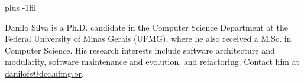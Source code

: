 \documentclass[10pt,journal,compsoc]{IEEEtran}
\begin{document}
\ifCLASSOPTIONcaptionsoff
  \newpage
\fi






%
%


% 

\baselineskip plus -1fil

\begin{IEEEbiography}{Danilo Silva}
is a Ph.D. candidate in the Computer Science Department at the Federal University of Minas Gerais (UFMG), where he also received a M.Sc. in Computer Science. His research interests include software architecture and modularity, software maintenance and evolution, and refactoring. Contact him at \url{danilofs@dcc.ufmg.br}.
\end{IEEEbiography}
\end{document}
